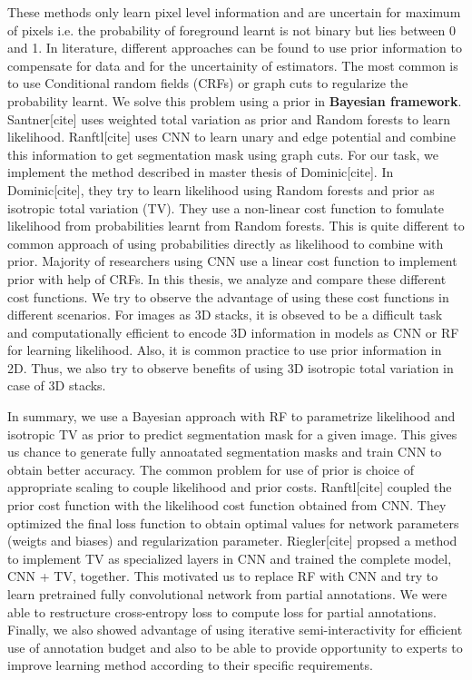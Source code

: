 These methods only learn pixel level information and are uncertain for maximum of pixels i.e. the probability of foreground learnt is not binary but lies between 0 and 1. In literature, different approaches can be found to use prior information to compensate for data and for the uncertainity of estimators. The most common is to use Conditional random fields (CRFs) or graph cuts to regularize the probability learnt. We solve this problem using a prior in \textbf{Bayesian framework}. Santner[cite] uses weighted total variation as prior and Random forests to learn likelihood. Ranftl[cite] uses CNN to learn unary and edge potential and combine this information to get segmentation mask using graph cuts. For our task, we implement the method described in master thesis of Dominic[cite]. In Dominic[cite], they try to learn likelihood using Random forests and prior as isotropic total variation (TV). They use a non-linear cost function to fomulate likelihood from probabilities learnt from Random forests. This is quite different to common approach of using probabilities directly as likelihood to combine with prior. Majority of researchers using CNN use a linear cost function to implement prior with help of CRFs. In this thesis, we analyze and compare these different cost functions. We try to observe the advantage of using these cost functions in different scenarios. For images as 3D stacks, it is obseved to be a difficult task and computationally efficient to encode 3D information in models as CNN or RF for learning likelihood. Also, it is common practice to use prior information in 2D. Thus, we also try to observe benefits of using 3D isotropic total variation in case of 3D stacks. \par

In summary, we use a Bayesian approach with RF to parametrize likelihood and isotropic TV as prior to predict segmentation mask for a given image. This gives us chance to generate fully annoatated segmentation masks and train CNN to obtain better accuracy. The common problem for use of prior is choice of appropriate scaling to couple likelihood and prior costs. Ranftl[cite] coupled the prior cost function with the likelihood cost function obtained from CNN. They optimized the final loss function to obtain optimal values for network parameters (weigts and biases) and regularization parameter. Riegler[cite] propsed a method to implement TV as specialized layers in CNN and trained the complete model, CNN + TV, together. This motivated us to replace RF with CNN and try to learn pretrained fully convolutional network from partial annotations. We were able to restructure cross-entropy loss to compute loss for partial annotations. \newline
Finally, we also showed advantage of using iterative semi-interactivity for efficient use of annotation budget and also to be able to provide opportunity to experts to improve learning method according to their specific requirements.


